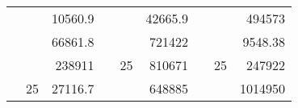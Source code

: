 \begin{table}[H]
\begin{tabular}{|ccrccrccc}
\rowcolor[HTML]{DAE8FC} 
\multicolumn{1}{|c|}{\cellcolor[HTML]{FFFFC7}}                                & \multicolumn{1}{c|}{\cellcolor[HTML]{DAE8FC}}                      & \multicolumn{1}{r|}{\cellcolor[HTML]{DAE8FC}10560.9}   & \multicolumn{1}{c|}{\cellcolor[HTML]{FFFFC7}}                                & \multicolumn{1}{c|}{\cellcolor[HTML]{DAE8FC}}                       & \multicolumn{1}{r|}{\cellcolor[HTML]{DAE8FC}42665.9}   & \multicolumn{1}{c|}{\cellcolor[HTML]{FFFFC7}}                                & \multicolumn{1}{c|}{\cellcolor[HTML]{DAE8FC}}                      & \multicolumn{1}{r|}{\cellcolor[HTML]{DAE8FC}494573}    \\ \cline{3-3} \cline{6-6} \cline{9-9} 
\multicolumn{1}{|c|}{\cellcolor[HTML]{FFFFC7}}                                & \multicolumn{1}{c|}{\cellcolor[HTML]{DAE8FC}}                      & \multicolumn{1}{r|}{\cellcolor[HTML]{DDFDFF}66861.8}   & \multicolumn{1}{c|}{\cellcolor[HTML]{FFFFC7}}                                & \multicolumn{1}{c|}{\cellcolor[HTML]{DAE8FC}}                       & \multicolumn{1}{r|}{\cellcolor[HTML]{DDFDFF}721422}    & \multicolumn{1}{c|}{\cellcolor[HTML]{FFFFC7}}                                & \multicolumn{1}{c|}{\cellcolor[HTML]{DAE8FC}}                      & \multicolumn{1}{r|}{\cellcolor[HTML]{DDFDFF}9548.38}   \\ \cline{3-3} \cline{6-6} \cline{9-9} 
\rowcolor[HTML]{DAE8FC} 
\multicolumn{1}{|c|}{\cellcolor[HTML]{FFFFC7}}                                & \multicolumn{1}{c|}{\cellcolor[HTML]{DAE8FC}}                      & \multicolumn{1}{r|}{\cellcolor[HTML]{DAE8FC}238911}    & \multicolumn{1}{c|}{\cellcolor[HTML]{FFFFC7}}                                & \multicolumn{1}{c|}{\multirow{-9}{*}{\cellcolor[HTML]{DAE8FC}25}}   & \multicolumn{1}{r|}{\cellcolor[HTML]{DAE8FC}810671}    & \multicolumn{1}{c|}{\cellcolor[HTML]{FFFFC7}}                                & \multicolumn{1}{c|}{\multirow{-9}{*}{\cellcolor[HTML]{DAE8FC}25}}  & \multicolumn{1}{r|}{\cellcolor[HTML]{DAE8FC}247922}    \\ \cline{3-3} \cline{5-6} \cline{8-9} 
\multicolumn{1}{|c|}{\cellcolor[HTML]{FFFFC7}}                                & \multicolumn{1}{c|}{\multirow{-10}{*}{\cellcolor[HTML]{DAE8FC}25}} & \multicolumn{1}{r|}{\cellcolor[HTML]{DDFDFF}27116.7}   & \multicolumn{1}{c|}{\cellcolor[HTML]{FFFFC7}}                                & \multicolumn{1}{c|}{\cellcolor[HTML]{DDFDFF}}                       & \multicolumn{1}{r|}{\cellcolor[HTML]{DAE8FC}648885}    & \multicolumn{1}{c|}{\cellcolor[HTML]{FFFFC7}}                                & \multicolumn{1}{c|}{\cellcolor[HTML]{DDFDFF}}                      & \multicolumn{1}{r|}{\cellcolor[HTML]{DAE8FC}1014950}   \\ \cline{2-3} \cline{6-6} \cline{9-9} 

\end{tabular}
\end{table}
